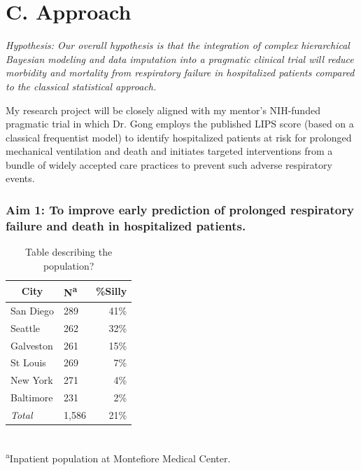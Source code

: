 \documentclass[11pt,notitlepage]{article}
\begin{document}
\section*{C. Approach}
\begin{flushleft}
\textit{Hypothesis: Our overall hypothesis is that the integration of complex hierarchical Bayesian modeling and data imputation into a pragmatic clinical trial will reduce morbidity and mortality from respiratory failure in hospitalized patients compared to the classical statistical approach.}
\end{flushleft} 

My research project will be closely aligned with my mentor's NIH-funded pragmatic trial in which Dr. Gong employs the published LIPS score \cite{Herridge_12594312} (based on a classical frequentist model) to identify hospitalized patients at risk for prolonged mechanical ventilation and death and initiates targeted interventions from a bundle of widely accepted care practices to prevent such adverse respiratory events.

\subsubsection*{Aim 1: To improve early prediction of prolonged respiratory failure and death in hospitalized patients.}

\begin{table} %
\caption{Table describing the population?}
\begin{center}
\begin{tabular}{l l r}
\toprule
\multicolumn{1}{c}{City} & {N\textsuperscript{a}} & {\%Silly}\\
\midrule
San Diego & 289 & 41\%\\
Seattle & 262 & 32\%\\
Galveston & 261 & 15\%\\
St Louis & 269 & 7\%\\
New York & 271 & 4\%\\
Baltimore & 231 & 2\%\\
\emph{Total} & 1,586 & 21\%\\
\hline
\end{tabular}\\
\footnotesize\textsuperscript{a}{Inpatient population at Montefiore Medical Center.}
\end{center}
\label{default}
\end{table}
\end{document}
